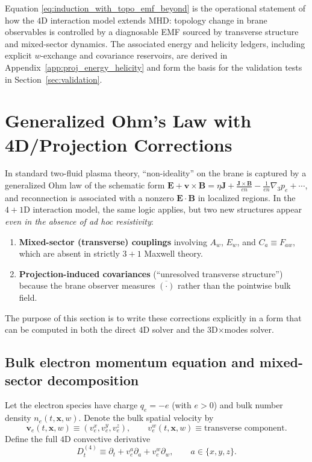 \documentclass[11pt]{article}
\newcommand{\gradthree}{\nabla_3}
\begin{document}
Equation \eqref{eq:induction_with_topo_emf_beyond} is the operational statement of how the
\(4\)D interaction model extends MHD: topology change in brane observables is controlled by a
diagnosable EMF sourced by transverse structure and mixed-sector dynamics. The associated
energy and helicity ledgers, including explicit \(w\)-exchange and covariance reservoirs,
are derived in Appendix~\ref{app:proj_energy_helicity} and form the basis for the validation
tests in Section~\ref{sec:validation}.

\section{Generalized Ohm's Law with 4D/Projection Corrections}
\label{sec:generalized_ohm_4d}

In standard two-fluid plasma theory, ``non-ideality'' on the brane is captured by a
generalized Ohm law of the schematic form
\(
\mathbf{E}+\mathbf{v}\times\mathbf{B}
=\eta\mathbf{J} + \frac{\mathbf{J}\times\mathbf{B}}{en} - \frac{1}{en}\gradthree p_e + \cdots
\),
and reconnection is associated with a nonzero
\(\mathbf{E}\cdot\mathbf{B}\) in localized regions.
In the \(4+1\)D interaction model, the same logic applies, but two new structures appear
\emph{even in the absence of ad hoc resistivity}:
\begin{enumerate}[leftmargin=1.6em]
\item \textbf{Mixed-sector (transverse) couplings} involving \(A_w\), \(E_w\), and
\(C_a\equiv F_{aw}\), which are absent in strictly \(3+1\) Maxwell theory.
\item \textbf{Projection-induced covariances} (``unresolved transverse structure'') because
the brane observer measures \(\overline{(\cdot)}\) rather than the pointwise bulk field.
\end{enumerate}
The purpose of this section is to write these corrections explicitly in a form that can be
computed in both the direct \(4\)D solver and the 3D\(\times\)modes solver.

\subsection{Bulk electron momentum equation and mixed-sector decomposition}
\label{subsec:ohm_bulk}

Let the electron species have charge \(q_e=-e\) (with \(e>0\)) and bulk number density
\(n_e(t,\mathbf{x},w)\). Denote the bulk spatial velocity by
\begin{equation}
\mathbf{v}_e(t,\mathbf{x},w)\equiv (v_e^x,v_e^y,v_e^z),
\qquad
v_e^w(t,\mathbf{x},w)\equiv \text{transverse component}.
\end{equation}
Define the full \(4\)D convective derivative
\begin{equation}
D_t^{(4)} \equiv \partial_t + v_e^a\partial_a + v_e^w\partial_w,
\qquad a\in\{x,y,z\}.
\label{eq:Dt4_def}
\end{equation}
\end{document}
